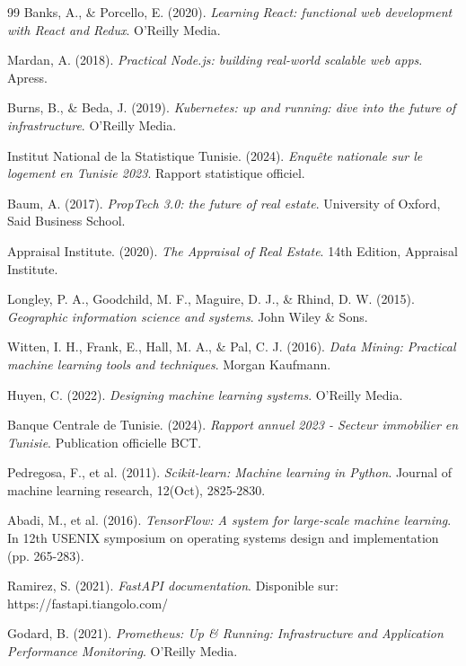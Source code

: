 \begin{thebibliography}{99}
Banks, A., \& Porcello, E. (2020). 
\textit{Learning React: functional web development with React and Redux}. 
O'Reilly Media.

Mardan, A. (2018). 
\textit{Practical Node.js: building real-world scalable web apps}. 
Apress.

Burns, B., \& Beda, J. (2019). 
\textit{Kubernetes: up and running: dive into the future of infrastructure}. 
O'Reilly Media.

Institut National de la Statistique Tunisie. (2024). 
\textit{Enquête nationale sur le logement en Tunisie 2023}. 
Rapport statistique officiel.

Baum, A. (2017). 
\textit{PropTech 3.0: the future of real estate}. 
University of Oxford, Said Business School.

Appraisal Institute. (2020). 
\textit{The Appraisal of Real Estate}. 
14th Edition, Appraisal Institute.

Longley, P. A., Goodchild, M. F., Maguire, D. J., \& Rhind, D. W. (2015). 
\textit{Geographic information science and systems}. 
John Wiley \& Sons.

Witten, I. H., Frank, E., Hall, M. A., \& Pal, C. J. (2016). 
\textit{Data Mining: Practical machine learning tools and techniques}. 
Morgan Kaufmann.

Huyen, C. (2022). 
\textit{Designing machine learning systems}. 
O'Reilly Media.

Banque Centrale de Tunisie. (2024). 
\textit{Rapport annuel 2023 - Secteur immobilier en Tunisie}. 
Publication officielle BCT.

Pedregosa, F., et al. (2011). 
\textit{Scikit-learn: Machine learning in Python}. 
Journal of machine learning research, 12(Oct), 2825-2830.

Abadi, M., et al. (2016). 
\textit{TensorFlow: A system for large-scale machine learning}. 
In 12th USENIX symposium on operating systems design and implementation (pp. 265-283).

Ramirez, S. (2021). 
\textit{FastAPI documentation}. 
Disponible sur: https://fastapi.tiangolo.com/

Godard, B. (2021). 
\textit{Prometheus: Up \& Running: Infrastructure and Application Performance Monitoring}. 
O'Reilly Media.


\end{thebibliography}

